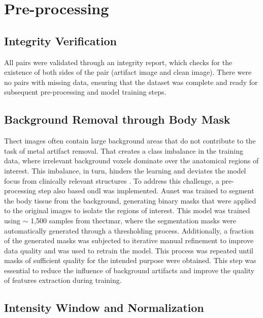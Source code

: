 \section{Pre-processing}

\subsection{Integrity Verification}

All pairs were validated through an integrity report, which checks for the existence of both sides of the pair (artifact image and clean image). There were no pairs with missing data, ensuring that the dataset was complete and ready for subsequent pre-processing and model training steps.

\subsection{Background Removal through Body Mask}

The\acrshort{ct} images often contain large background areas that do not contribute to the task of metal artifact removal. That creates a class imbalance in the training data, where irrelevant background voxels dominate over the anatomical regions of interest. This imbalance, in turn, hinders the learning and deviates the model focus from clinically relevant structures \cite{taghanakiComboLossHandling2021, kesimalUseDeepLearning2026}. To address this challenge, a pre-processing step also based on\acrshort{dl} was implemented. A\acrshort{unet} was trained to segment the body tissue from the background, generating binary masks that were applied to the original images to isolate the regions of interest. This model was trained using $\sim$ 1,500 samples from the\acrshort{ctmar}, where the segmentation masks were automatically generated through a thresholding process. Additionally, a fraction of the generated masks was subjected to iterative manual refinement to improve data quality and was used to retrain the model. This process was repeated until masks of sufficient quality for the intended purpose were obtained.
This step was essential to reduce the influence of background artifacts and improve the quality of features extraction during training. 

\subsection{Intensity Window and Normalization}
\label{subsec:intensity-window}

